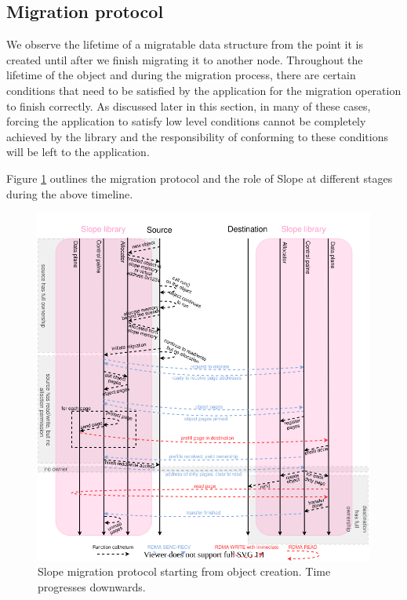 \subsection{Migration protocol}
\label{sec:migrationprotocol}
We observe the lifetime of a migratable data structure from the point it is
created until after we finish migrating it to another node. Throughout the
lifetime of the object and during the migration process, there are certain
conditions that need to be satisfied by the application for the migration
operation to finish correctly. As discussed later in this section,
in many of these cases, forcing the application to satisfy low level conditions
cannot be completely achieved by the library and the responsibility of
conforming to these conditions will be left to the application.

Figure \ref{fig:migrationprotocol} outlines the migration protocol and the role
of Slope at different stages during the above timeline.

\begin{figure}[t]
\centering

\includegraphics[width=1\textwidth]{migration-protocol.drawio}
\caption{
    Slope migration protocol starting from object creation. Time progresses
    downwards.
}
\label{fig:migrationprotocol}
\end{figure}

